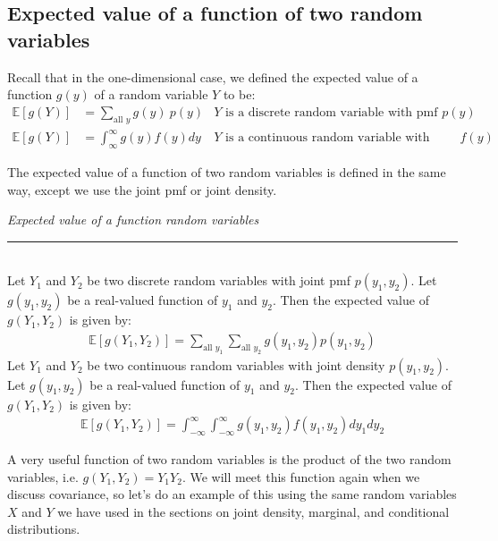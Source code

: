 \documentclass[12pt]{article}
\theoremstyle{definition}
\theoremstyle{remark}
\def\E{{\mathbb E}}
\begin{document}
\subsection{Expected value of a function of two random variables}
Recall that in the one-dimensional case, we defined the expected value of a function $g(y)$ of a random variable $Y$ to be:
\begin{align*}
\E[g(Y)] &= \sum_{\text{all }y}g(y)\:p(y) &\text{$Y$ is a discrete random variable with pmf $p(y)$}\\
\E[g(Y)] &= \int_{\infty}^\infty g(y) f(y) dy &\text{$Y$ is a continuous random variable with density $f(y)$}
\end{align*}

The expected value of a function of two random variables is defined in the same way, except we use the joint pmf or joint density.

\begin{framed}
\emph{Expected value of a function random variables}\\
  \rule{\dimexpr{}\fboxrule}{.1pt} \\
Let $Y_1$ and $Y_2$ be two discrete random variables with joint pmf $p(y_1, y_2)$. Let $g(y_1, y_2)$ be a real-valued function of $y_1$ and $y_2$. Then the expected value of $g(Y_1, Y_2)$ is given by:
\begin{align*}
\E[g(Y_1, Y_2)] = \sum_{\text{all }y_1} \sum_{\text{all }y_2} g(y_1, y_2) p(y_1, y_2)
\end{align*}
Let $Y_1$ and $Y_2$ be two continuous random variables with joint density $p(y_1, y_2)$. Let $g(y_1, y_2)$ be a real-valued function of $y_1$ and $y_2$. Then the expected value of $g(Y_1, Y_2)$ is given by:
\begin{align*}
\E[g(Y_1, Y_2)] = \int_{-\infty}^\infty \int_{-\infty}^\infty g(y_1, y_2) f(y_1, y_2) dy_1 dy_2
\end{align*}
\end{framed}

A very useful function of two random variables is the product of the two random variables, i.e. $g(Y_1, Y_2) = Y_1 Y_2$. We will meet this function again when we discuss covariance, so let's do an example of this using the same random variables $X$ and $Y$ we have used in the sections on joint density, marginal, and conditional distributions.
\end{document}
